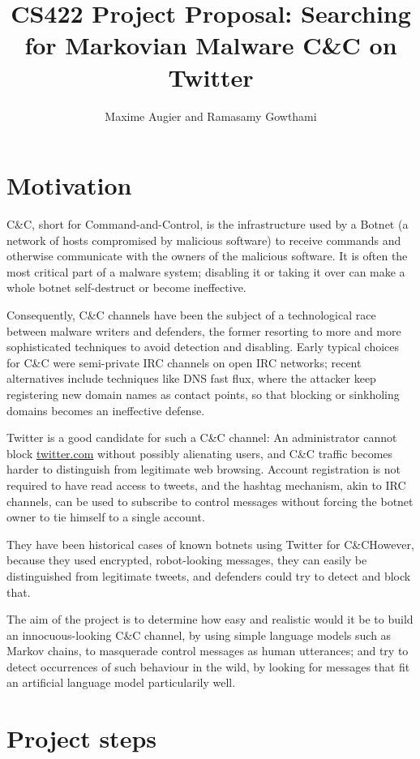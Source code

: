 \documentclass[a4paper,11pt]{article}
\title{CS422 Project Proposal: Searching for Markovian Malware C\&C on Twitter}
\author{Maxime Augier and Ramasamy Gowthami}
\begin{document}
\maketitle



\section{Motivation}

C\&C, short for Command-and-Control, is the infrastructure used by a Botnet (a network of hosts compromised by malicious software) to receive
commands and otherwise communicate with the owners of the malicious software. It is often the most critical part of a malware system; disabling it or taking it over can make a whole botnet self-destruct or become ineffective.

Consequently, C\&C channels have been the subject of a technological race between malware writers and defenders, the former resorting to more and more sophisticated techniques to avoid detection and disabling. Early typical choices for C\&C were semi-private IRC channels on open IRC networks; recent alternatives include techniques like DNS fast flux, where the attacker keep registering new domain names as contact points, so that blocking or sinkholing domains becomes an ineffective defense.

Twitter is a good candidate for such a C\&C channel: An administrator cannot block \url{twitter.com} without possibly alienating users, and C\&C traffic becomes harder to distinguish from legitimate web browsing. Account registration is not required to have read access to tweets, and the hashtag mechanism, akin to IRC channels, can be used to subscribe to control messages without forcing the botnet owner to tie himself to a single account. 

They have been historical cases of known botnets using Twitter for C\&CHowever, because they used encrypted, robot-looking messages, they can easily be distinguished from legitimate tweets, and defenders could try to detect and block that.

The aim of the project is to determine how easy and realistic would it be to build an innocuous-looking C\&C channel, by using simple language models such as Markov chains, to masquerade control messages as human utterances; and try to detect occurrences of such behaviour in the wild, by looking for messages that fit an artificial language model particularily well.


\section{Project steps}
\end{document}
